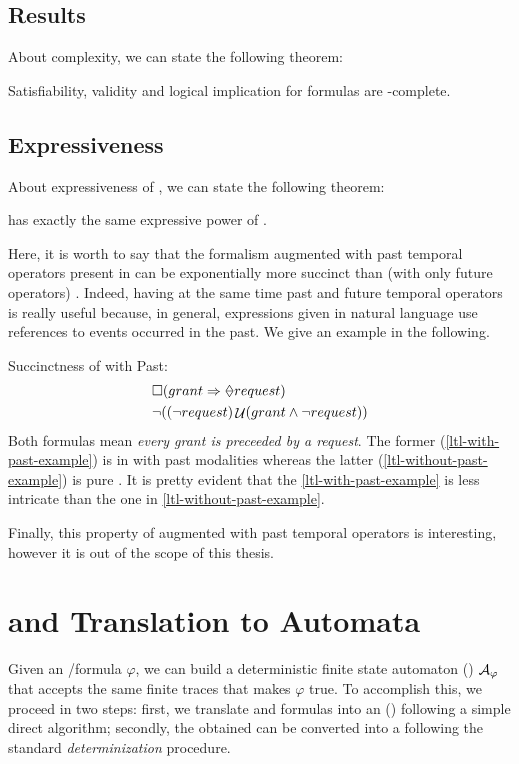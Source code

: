 \subsection{Results}
About \PLTL complexity, we can state the following theorem:
\begin{theorem}
Satisfiability, validity and logical implication for \PLTL formulas are \PSPACE-complete.
\end{theorem}

\subsection{Expressiveness}
About expressiveness of \PLTL, we can state the following theorem:
\begin{theorem}\label{th:expr-ltl-pltl}
\PLTL has exactly the same expressive power of \LTLf.
\end{theorem}

\noindent Here, it is worth to say that the \LTL formalism augmented with past temporal operators present in \PLTL can be exponentially more succinct than \LTL (with only future operators) \citep{markey2003temporal}.
Indeed, having at the same time past and future temporal operators is really useful because, in general, expressions given in natural language use references to events occurred in the past. We give an example in the following.
\begin{example}\label{succinctness-example}
Succinctness of \LTL with Past:
\begin{align}
&\Box(grant \Rightarrow \Once request)\label{ltl-with-past-example}\\
&\lnot((\lnot request) \lUntil (grant \lAND \lnot request))\label{ltl-without-past-example}
\end{align}
Both formulas mean \emph{every grant is preceeded by a request}. The  former (\ref{ltl-with-past-example}) is in \LTL with past modalities whereas the latter (\ref{ltl-without-past-example}) is pure \LTL. It is pretty evident that the \ref{ltl-with-past-example} is less intricate than the one in \ref{ltl-without-past-example}.
\end{example}
Finally, this property of \LTL augmented with past temporal operators is interesting, however it is out of the scope of this thesis.
\section{\LTLf and \PLTL Translation to  Automata}\label{sec:formula-to-automa}
Given an \LTLf/\PLTL formula $\varphi$, we can build a deterministic finite state automaton (\DFA) \citep{Rabin:1959:FAD:1661907.1661909} 
$\mathcal{A}_\varphi$ that accepts the same finite traces that makes $\varphi$ true. To accomplish this, we proceed in two steps: first, we translate \LTLf and \PLTL formulas into an (\NFA) \citep{DeGiacomo:2015:SLL:2832415.2832466} following a simple direct algorithm; secondly, the obtained \NFA can be converted into a \DFA following the standard \emph{determinization}  procedure.

